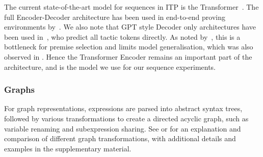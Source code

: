 \documentclass[letterpaper]{article} %
\begin{document}
    The current state-of-the-art model for sequences in ITP
    is the Transformer~\cite{vaswani_attention_2017}.
    The full Encoder-Decoder architecture has been used in end-to-end proving environments by~\cite{lample_hypertree_2022, wu_int_2020}.
    We also note that GPT style Decoder only architectures have been used in~\cite{polu_generative_2020, polu_formal_2022, han_proof_2021}, who predict all tactic tokens directly.
    As noted by~\cite{yang_leandojo_2023}, this is a bottleneck for premise selection and limits model generalisation, which was also observed in \cite{wu_int_2020}.
    Hence the Transformer Encoder remains an important part of the architecture, and is the model we use for our sequence experiments.

    \subsubsection{Graphs}
    For graph representations, expressions are parsed into abstract syntax trees, followed by various transformations to create a directed acyclic graph, such as variable renaming and subexpression sharing. See \cite{paliwal_graph_2020} or \cite{wang_premise_2017} for an explanation and comparison of different graph transformations, with additional details and examples in the supplementary material.
\end{document}
